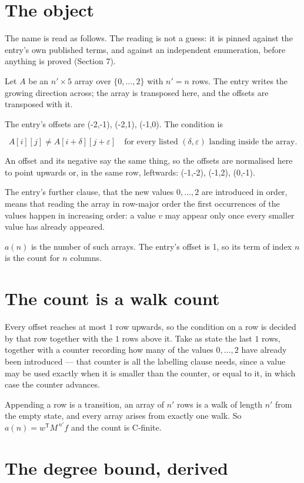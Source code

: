 \documentclass[11pt]{article}
\theoremstyle{definition}
\begin{document}
\section{The object}

The name is read as follows. The reading is not a guess: it is pinned against the entry's own published terms, and against an independent enumeration, before anything is proved (Section 7).

Let $A$ be an $n' \times 5$ array over $\{0,\dots,2\}$ with $n' = n$ rows. The entry writes the growing direction across; the array is transposed here, and the offsets are transposed with it.

The entry's offsets are (-2,-1), (-2,1), (-1,0). The condition is

\[A[i][j] \ne A[i{+}\delta][j{+}\varepsilon]\quad\text{for every listed }(\delta,\varepsilon)\text{ landing inside the array.}\]

An offset and its negative say the same thing, so the offsets are normalised here to point upwards or, in the same row, leftwards: (-1,-2), (-1,2), (0,-1).

The entry's further clause, that the new values $0,\dots,2$ are introduced in order, means that reading the array in row-major order the first occurrences of the values happen in increasing order: a value $v$ may appear only once every smaller value has already appeared.

$a(n)$ is the number of such arrays. The entry's offset is 1, so its term of index $n$ is the count for $n$ columns.

\section{The count is a walk count}

Every offset reaches at most $1$ row upwards, so the condition on a row is decided by that row together with the $1$ rows above it. Take as state the last $1$ rows, together with a counter recording how many of the values $0,\dots,2$ have already been introduced --- that counter is all the labelling clause needs, since a value may be used exactly when it is smaller than the counter, or equal to it, in which case the counter advances.

Appending a row is a transition, an array of $n'$ rows is a walk of length $n'$ from the empty state, and every array arises from exactly one walk. So $a(n) = w^{\mathsf T}M^{\,n'}f$ and the count is C-finite.

\section{The degree bound, derived}
\end{document}
